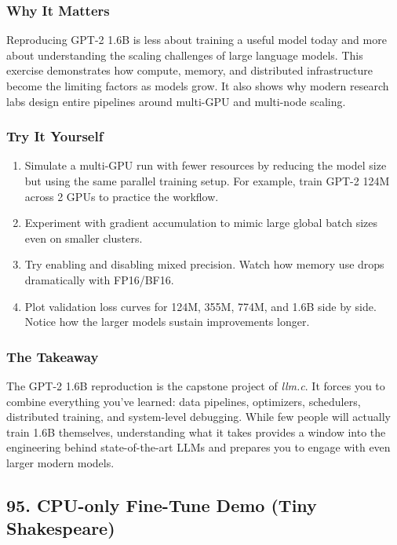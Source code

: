 \documentclass[
  letterpaper,
  DIV=11,
  numbers=noendperiod]{scrreprt}
\providecommand{\tightlist}{%
  \setlength{\itemsep}{0pt}\setlength{\parskip}{0pt}}
\begin{document}
\subsubsection{Why It Matters}\label{why-it-matters-68}

Reproducing GPT-2 1.6B is less about training a useful model today and
more about understanding the scaling challenges of large language
models. This exercise demonstrates how compute, memory, and distributed
infrastructure become the limiting factors as models grow. It also shows
why modern research labs design entire pipelines around multi-GPU and
multi-node scaling.

\subsubsection{Try It Yourself}\label{try-it-yourself-82}

\begin{enumerate}
\def\labelenumi{\arabic{enumi}.}
\tightlist
\item
  Simulate a multi-GPU run with fewer resources by reducing the model
  size but using the same parallel training setup. For example, train
  GPT-2 124M across 2 GPUs to practice the workflow.
\item
  Experiment with gradient accumulation to mimic large global batch
  sizes even on smaller clusters.
\item
  Try enabling and disabling mixed precision. Watch how memory use drops
  dramatically with FP16/BF16.
\item
  Plot validation loss curves for 124M, 355M, 774M, and 1.6B side by
  side. Notice how the larger models sustain improvements longer.
\end{enumerate}

\subsubsection{The Takeaway}\label{the-takeaway-83}

The GPT-2 1.6B reproduction is the capstone project of \emph{llm.c}. It
forces you to combine everything you've learned: data pipelines,
optimizers, schedulers, distributed training, and system-level
debugging. While few people will actually train 1.6B themselves,
understanding what it takes provides a window into the engineering
behind state-of-the-art LLMs and prepares you to engage with even larger
modern models.

\subsection{95. CPU-only Fine-Tune Demo (Tiny
Shakespeare)}\label{cpu-only-fine-tune-demo-tiny-shakespeare}
\end{document}
